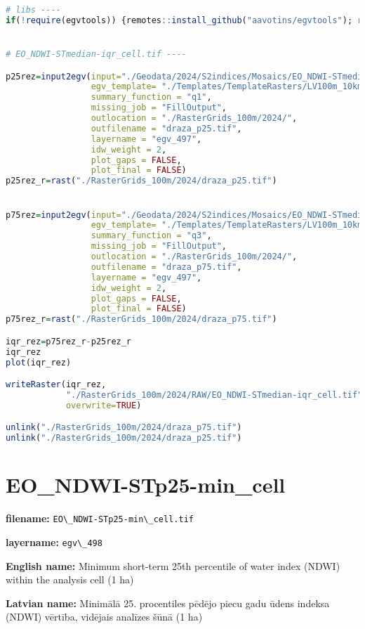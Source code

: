 \documentclass[
]{book}
\newcommand{\passthrough}[1]{#1}
\begin{document}
\begin{lstlisting}[language=R]
# libs ----
if(!require(egvtools)) {remotes::install_github("aavotins/egvtools"); require(egvtools)}


# EO_NDWI-STmedian-iqr_cell.tif ----

p25rez=input2egv(input="./Geodata/2024/S2indices/Mosaics/EO_NDWI-STmedian.tif",
                 egv_template= "./Templates/TemplateRasters/LV100m_10km.tif",
                 summary_function = "q1",
                 missing_job = "FillOutput",
                 outlocation = "./RasterGrids_100m/2024/",
                 outfilename = "draza_p25.tif",
                 layername = "egv_497",
                 idw_weight = 2,
                 plot_gaps = FALSE,
                 plot_final = FALSE)
p25rez_r=rast("./RasterGrids_100m/2024/draza_p25.tif")


p75rez=input2egv(input="./Geodata/2024/S2indices/Mosaics/EO_NDWI-STmedian.tif",
                 egv_template= "./Templates/TemplateRasters/LV100m_10km.tif",
                 summary_function = "q3",
                 missing_job = "FillOutput",
                 outlocation = "./RasterGrids_100m/2024/",
                 outfilename = "draza_p75.tif",
                 layername = "egv_497",
                 idw_weight = 2,
                 plot_gaps = FALSE,
                 plot_final = FALSE)
p75rez_r=rast("./RasterGrids_100m/2024/draza_p75.tif")

iqr_rez=p75rez_r-p25rez_r
iqr_rez
plot(iqr_rez)

writeRaster(iqr_rez,
            "./RasterGrids_100m/2024/RAW/EO_NDWI-STmedian-iqr_cell.tif",
            overwrite=TRUE)

unlink("./RasterGrids_100m/2024/draza_p75.tif")
unlink("./RasterGrids_100m/2024/draza_p25.tif")
\end{lstlisting}

\section{EO\_NDWI-STp25-min\_cell}\label{ch06.498}

\textbf{filename:} \passthrough{\lstinline!EO\_NDWI-STp25-min\_cell.tif!}

\textbf{layername:} \passthrough{\lstinline!egv\_498!}

\textbf{English name:} Minimum short-term 25th percentile of water index (NDWI) within the analysis cell (1 ha)

\textbf{Latvian name:} Minimālā 25. procentiles pēdējo piecu gadu ūdens indeksa (NDWI) vērtība, vidējais analīzes šūnā (1 ha)
\end{document}
